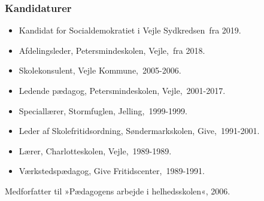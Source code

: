 \documentclass[11pt, a4paper]{awesome-cv}
\begin{document}
\begin{cvletter}
\subsubsection*{Kandidaturer}
\begin{itemize}
\item Kandidat for Socialdemokratiet i Vejle Sydkredsen fra 2019.
\end{itemize}
\begin{itemize}
\item Afdelingsleder, Petersmindeskolen, Vejle, fra 2018.
\item Skolekonsulent, Vejle Kommune, 2005-2006.
\item Ledende pædagog, Petersmindeskolen, Vejle, 2001-2017.
\item Speciallærer, Stormfuglen, Jelling, 1999-1999.
\item Leder af Skolefritidsordning, Søndermarkskolen, Give, 1991-2001.
\item Lærer, Charlotteskolen, Vejle, 1989-1989.
\item Værkstedspædagog, Give Fritidscenter, 1989-1991.
\end{itemize}
Medforfatter til »Pædagogens arbejde i helhedsskolen«, 2006.

\end{cvletter}
\end{document}
